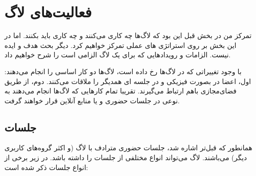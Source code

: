 \section{فعالیت‌های لاگ}

تمرکز من در بخش قبل این بود که لاگ‌ها چه کاری می‌کنند و چه کاری باید بکنند.
اما در این بخش بر روی استراتژی های عملی تمرکز خواهیم کرد. دیگر بحث هدف
و ایده نیست. الزامات و رویدادهایی که برای یک لاگ الزامی است را شرح خواهیم داد.

با وجود تغییراتی که در لاگ‌ها رخ داده است، لاگ‌ها دو کار اساسی را انجام می‌دهند:
اول، اعضا در بصورت فیزیکی و در جلسه ای همدیگر را ملاقات می‌کنند. دوم،
از طریق فضای‌مجازی باهم ارتباط می‌گیرند.
تقریبا تمام کارهایی که لاگ‌ها انجام می‌دهند به نوعی در جلسات حضوری و یا منابع آنلاین
قرار خواهند گرفت.

\subsection{جلسات}

همانطور که قبل‌تر اشاره شد، جلسات حضوری مترادف با لاگ
(و اکثر گروه‌های کاربری دیگر) می‌باشند. لاگ می‌تواند انواع مختلفی از جلسات را داشته باشد.
در زیر برخی از انواع جلسات ذکر شده است:

